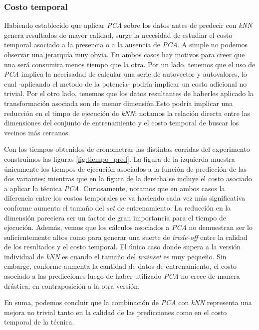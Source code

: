 \subsubsection{Costo temporal}
Habiendo establecido que aplicar \emph{PCA} sobre los datos antes de predecir con \emph{kNN} genera resultados de mayor calidad, surge la necesidad de estudiar el costo temporal asociado a la presencia o a la ausencia de \emph{PCA}. A simple no podemos observar una jerarquía muy obvia. En ambos casos hay motivos para creer que una será consumira menos tiempo que la otra. Por un lado, tenemos que el uso de \emph{PCA} implica la neceisadad de calcular una serie de autovector y autovalores, lo cual -aplicando el metodo de la potencia- podría implicar un costo adicional no trivial. Por el otro lado, tenemos que los datos resultantes de haberles aplicado la transformación asociada son de menor dimensión.Esto podría implicar una reducción en el timpo de ejecución de \emph{kNN}; notamos la relación directa entre las dimensiones del conjunto de entrenamiento y el costo temporal de buscar los vecinos más cercanos.
\par
Con los tiempos obtenidos de cronometrar las distintas corridas del experimento construimos las figuras \ref{fig:tiempo_pred}. La figura de la izquierda muestra únicamente los tiempos de ejecución asociados a la función de predicción de las dos variantes; mientras que en la figura de la derecha se incluye el costo asociado a aplicar la técnica \emph{PCA}. Curiosamente, notamos que en ambos casos la diferencia entre los costos temporales se va haciendo cada vez más significativa conforme aumenta el tamaño del \emph{set} de entrenamiento. La reducción en la dimensión pareciera ser un factor de gran importancia para el tiempo de ejecución. Además, vemos que los cálculos asociados a \emph{PCA} no demuestran ser lo suficientemente altos como para generar una suerte de \emph{trade-off} entre la calidad de los resultados y el costo temporal. El único caso donde supera a la versión individual de \emph{kNN} es cuando el tamaño del \emph{trainset} es muy pequeño. Sin embarge, conforme aumenta la cantidad de datos de entrenamiento, el costo asociado a las predicciones luego de haber utilizado \emph{PCA} no crece de manera drástica; en contraposición a la otra versión.
\par
En suma, podemos concluir que la combinación de \emph{PCA} con \emph{kNN} representa una mejora no trivial tanto en la calidad de las predicciones como en el costo temporal de la técnica. 

